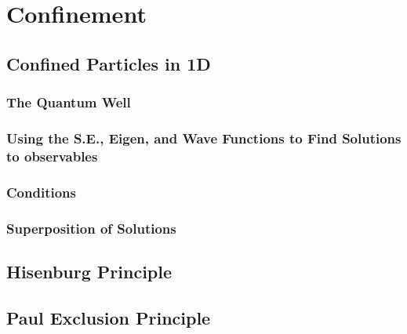 \documentclass[../../Quantum-Technologies-Notes]{subfiles}
\begin{document}
	
	\ifSubfilesClassLoaded{ \pagestyle{fancy} }{}
	

	\section{Confinement}
		
		
		
		\subsection{Confined Particles in 1D}
		
			
			
			\subsubsection{The Quantum Well}
			
				
				
				
			
			
			\subsubsection{Using the S.E., Eigen, and Wave Functions to Find Solutions to observables}
			
			
			\subsubsection{Conditions}
			
			
			\subsubsection{Superposition of Solutions}
			
			
		\subsection{Hisenburg Principle}
		
		
		\subsection{Paul Exclusion Principle}
			
			
		
\end{document}
